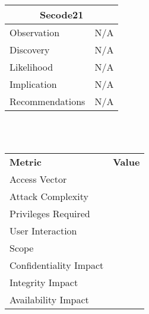 \documentclass[headsepline,footsepline,footinclude=false,oneside,fontsize=11pt,paper=a4,listof=totoc,bibliography=totoc]{scrbook} %
\begin{document}
\begin{tabular}{ p{3cm}|p{13cm}  }
	\hline
	\multicolumn{2}{c}{\textbf{Secode21}} \\ 
	\hline
	Observation   & N/A    \\
	Discovery  &   N/A  \\
	Likelihood & N/A \\
	Implication    & N/A \\
	Recommendations& N/A \\ 
	\hline
\end{tabular}
\\
\vspace{0.5cm}
\\
\begin{center}
	\begin{tabular}{ll}
		\rowcolor[HTML]{34CDF9} 
		{\color[HTML]{ECF4FF} \textbf{Metric}}        & {\color[HTML]{ECF4FF} \textbf{Value}} \\
		\rowcolor[HTML]{BBDAFF} 
		{\color[HTML]{333333} Access Vector}          & {\color[HTML]{333333} }               \\
		\rowcolor[HTML]{ECF4FF} 
		{\color[HTML]{333333} Attack Complexity}      & {\color[HTML]{333333} }               \\
		\rowcolor[HTML]{BBDAFF} 
		{\color[HTML]{333333} Privileges Required}    & {\color[HTML]{333333} }               \\
		\rowcolor[HTML]{ECF4FF} 
		{\color[HTML]{333333} User Interaction}       & {\color[HTML]{333333} }               \\
		\rowcolor[HTML]{BBDAFF} 
		{\color[HTML]{333333} Scope}                  & {\color[HTML]{333333} }               \\
		\rowcolor[HTML]{ECF4FF} 
		{\color[HTML]{333333} Confidentiality Impact} & {\color[HTML]{333333} }               \\
		\rowcolor[HTML]{BBDAFF} 
		{\color[HTML]{333333} Integrity Impact}       & {\color[HTML]{333333} }               \\
		\rowcolor[HTML]{ECF4FF} 
		{\color[HTML]{333333} Availability Impact}    & {\color[HTML]{333333} }              
	\end{tabular}
\end{center}
\pagebreak 
\end{document}
